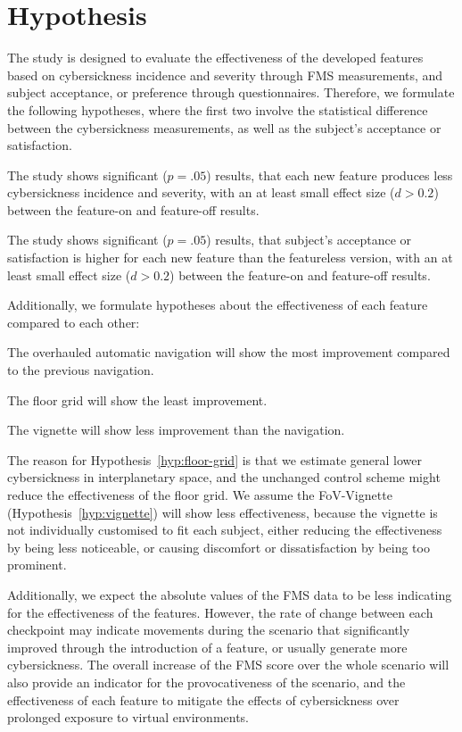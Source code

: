 \section{Hypothesis}\label{sec:hypothesis}

The study is designed to evaluate the effectiveness of the developed features based on cybersickness incidence and
severity through FMS measurements, and subject acceptance, or preference through questionnaires.
Therefore, we formulate the following hypotheses, where the first two involve the statistical difference between
the cybersickness measurements, as well as the subject's acceptance or satisfaction.
\begin{hypothesis}
    \label{hyp:cybersickness}
    The study shows significant ($p = .05$) results, that each new feature produces less cybersickness incidence and
    severity, with an at least small effect size ($d > 0.2$) between the feature-on and feature-off results.
\end{hypothesis}
\begin{hypothesis}
    \label{hyp:satisfaction}
    The study shows significant ($p = .05$) results, that subject's acceptance or satisfaction is higher for each new
    feature than the featureless version, with an at least small effect size ($d > 0.2$) between the feature-on and
    feature-off results.
\end{hypothesis}

Additionally, we formulate hypotheses about the effectiveness of each feature compared to each other:
\begin{hypothesis}
    \label{hyp:navigation}
    The overhauled automatic navigation will show the most improvement compared to the previous navigation.
\end{hypothesis}
\begin{hypothesis}
    \label{hyp:floor-grid}
    The floor grid will show the least improvement.
\end{hypothesis}
\begin{hypothesis}
    \label{hyp:vignette}
    The vignette will show less improvement than the navigation.
\end{hypothesis}
The reason for Hypothesis~\ref{hyp:floor-grid} is that we estimate general lower cybersickness in interplanetary
space, and the unchanged control scheme might reduce the effectiveness of the floor grid.
We assume the FoV-Vignette (Hypothesis~\ref{hyp:vignette}) will show less effectiveness, because the vignette is not
individually customised to fit each subject, either reducing the effectiveness by being less noticeable, or causing
discomfort or dissatisfaction by being too prominent.

Additionally, we expect the absolute values of the FMS data to be less indicating for the effectiveness of the
features.
However, the rate of change between each checkpoint may indicate movements during the scenario that significantly
improved through the introduction of a feature, or usually generate more cybersickness.
The overall increase of the FMS score over the whole scenario will also provide an indicator for the provocativeness
of the scenario, and the effectiveness of each feature to mitigate the effects of cybersickness over prolonged exposure
to virtual environments.
